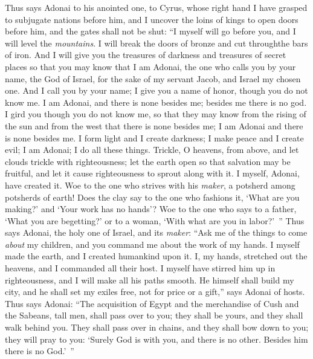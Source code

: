 \begin{biblechapter} %
\verse Thus says Adonai to his anointed one, 
to Cyrus, whose right hand I have grasped 
to subjugate nations before him, 
and I uncover the loins of kings 
to open doors before him, 
and the gates shall not be shut:
\verse “I myself will go before you, 
and I will level the \textit{mountains}. 
I will break the doors of bronze 
and cut throughthe bars of iron.
\verse And I will give you the treasures of darkness 
and treasures of secret places 
so that you may know that I am Adonai, 
the one who calls you by your name, the God of Israel,
\verse for the sake of my servant Jacob, 
and Israel my chosen one. 
And I call you by your name; 
I give you a name of honor, though you do not know me.
\verse I am Adonai, and there is none besides me; 
besides me there is no god. 
I gird you though you do not know me,
\verse so that they may know from the rising of the sun 
and from the west that there is none besides me; 
I am Adonai and there is none besides me.
\verse I form light and I create darkness; 
I make peace and I create evil; 
I am Adonai; I do all these things.
\verse Trickle, O heavens, from above, 
and let clouds trickle with righteousness; 
let the earth open so that salvation may be fruitful, 
and let it cause righteousness to sprout along with it. 
I myself, Adonai, have created it.
\verse Woe to the one who strives with his \textit{maker}, 
a potsherd among potsherds of earth! 
Does the clay say to the one who fashions it, 
‘What are you making?’ 
and ‘Your work has no hands’?
\verse Woe to the one who says to a father, ‘What you are begetting?’ 
or to a woman, ‘With what are you in labor?’ ”
\verse Thus says Adonai, the holy one of Israel, 
and its \textit{maker}: 
“Ask me of the things to come \textit{about} my children, 
and you command me about the work of my hands.
\verse I myself made the earth, 
and I created humankind upon it. 
I, my hands, stretched out the heavens, 
and I commanded all their host.
\verse I myself have stirred him up in righteousness, 
and I will make all his paths smooth. 
He himself shall build my city, 
and he shall set my exiles free, not for price or a gift,” says Adonai of hosts.
 Thus says Adonai: 
“The acquisition of Egypt 
and the merchandise of Cush 
and the Sabeans, tall men, 
shall pass over to you; 
they shall be yours, 
and they shall walk behind you. 
They shall pass over in chains, 
and they shall bow down to you; 
they will pray to you: 
‘Surely God is with you, and there is no other. 
Besides him there is no God.’ ”

\end{biblechapter}
